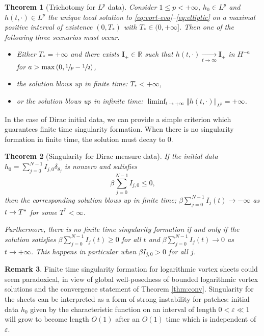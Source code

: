 \documentclass[10pt]{amsart}
\theoremstyle{plain}
\newtheorem{theorem}{Theorem}[section]
\theoremstyle{definition}
\newtheorem{remark}[theorem]{Remark}
\let\bt\beta
\let\dlt\delta
\let\tht\theta
\let\varep\varepsilon
\newcommand{\bfI}{{\mathbf I}}
\begin{document}
\begin{theorem}[Trichotomy for $L^p$ data] \label{thm:tri}
Consider $1\leq p<+\infty$, $h_0\in L^p$ and $h(t,\cdot)\in L^p$ the unique local solution to \eqref{eq:vort-evo}--\eqref{eq:elliptic} on a maximal positive interval of existence $(0,T_*)$ with $T_*\in (0,+\infty]$. Then one of the following three scenarios must occur.
\begin{itemize}
\item Either $T_*=+\infty$ and there exists $\bfI_+\in \mathbb{R}$ such that $h(t,\cdot)\underset{t\to \infty}{\to} \bfI_+$ in $H^{-a}$ for $a>\max\left(0,\sfrac{1}{p}-\sfrac{1}{2}\right)$,
\item the solution blows up in finite time: $T_*<+\infty$,
\item or the solution blows up in infinite time: $\liminf_{t\to +\infty}\left\Vert h(t,\cdot)\right\Vert_{L^p}=+\infty$.
\end{itemize}
\end{theorem}

In the case of Dirac initial data, we can provide a simple criterion which guarantees finite time singularity formation. When there is no singularity formation in finite time, the solution must decay to 0.

\begin{theorem}[Singularity for Dirac measure data] \label{thm:blowup-Dirac}
If the initial data $h_0 = \sum_{j=0}^{N-1} I_{j,0} \dlt_{\tht_j}$ is nonzero and satisfies
\[
\bt \sum_{j=0}^{N-1} I_{j,0} \le 0,
\]
then the corresponding solution blows up in finite time; $\bt \sum_{j=0}^{N-1} I_j(t) \to -\infty$ as $t\to\nobreak T^*$ for some $T^*<\infty$.

Furthermore, there is no finite time singularity formation if and only if the solution satisfies $\bt \sum_{j=0}^{N-1} I_j(t) \geq 0$ for all $t$ and $\bt \sum_{j=0}^{N-1} I_j(t) \to 0$ as $t\to +\infty$. This happens in particular when $\bt I_{j,0} > 0$ for all $j$.
\end{theorem}

\begin{remark}
Finite time singularity formation for logarithmic vortex sheets could seem paradoxical, in view of global well-posedness of bounded logarithmic vortex solutions and the convergence statement of Theorem \ref{thm:conv}. Singularity for the sheets can be interpreted as a form of strong instability for patches: initial data $h_{0}$ given by the characteristic function on an interval of length $0<\varep\ll 1$ will grow to become length $O(1)$ after an $O(1)$ time which is independent of $\varep$.
\end{remark}
\end{document}
